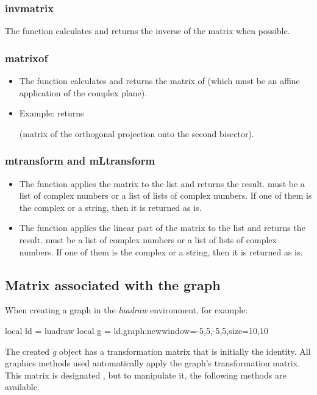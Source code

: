 \subsubsection{invmatrix}
The function  calculates and returns the inverse of the matrix  when possible.

\subsubsection{matrixof}
\begin{itemize}
    \item The function  calculates and returns the matrix of  (which must be an affine application of the complex plane).
    \item Example:  returns \par
{} (matrix of the orthogonal projection onto the second bisector).
\end{itemize}

\subsubsection{mtransform and mLtransform}
\begin{itemize}
    \item The function  applies the matrix  to the list  and returns the result.  must be a list of complex numbers or a list of lists of complex numbers. If one of them is the complex  or a string, then it is returned as is.

    \item The function  applies the linear part of the matrix  to the list  and returns the result.  must be a list of complex numbers or a list of lists of complex numbers. If one of them is the complex  or a string, then it is returned as is.
\end{itemize}

\subsection{Matrix associated with the graph}

When creating a graph in the \emph{luadraw} environment, for example:
\begin{Luacode}
local ld = luadraw
local g = ld.graph:new{window={-5,5,-5,5},size={10,10}}
\end{Luacode}
The created \emph{g} object has a transformation matrix that is initially the identity. All graphics methods used automatically apply the graph's transformation matrix. This matrix is ​​designated , but to manipulate it, the following methods are available.

